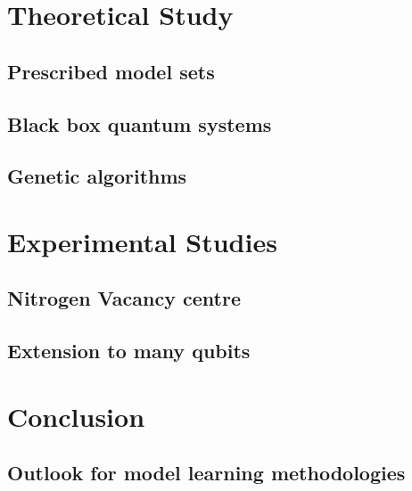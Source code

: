 \part{Theoretical Study}\label{part:theoretical_study}
    \chapter{Prescribed model sets}\label{chapter:lattices}
    \chapter{Black box quantum systems}\label{chapter:black_box}
        
    \chapter{Genetic algorithms}\label{chapter:ga}

\part{Experimental Studies}\label{part:experimental_study}
    \chapter{Nitrogen Vacancy centre}\label{chapter:nv}
        
    \chapter{Extension to many qubits}\label{chapter:many_qubits}
        
    
\part{Conclusion}\label{part:conclusion}
    \chapter{Outlook for model learning methodologies}\label{chapter:outlook}
        



